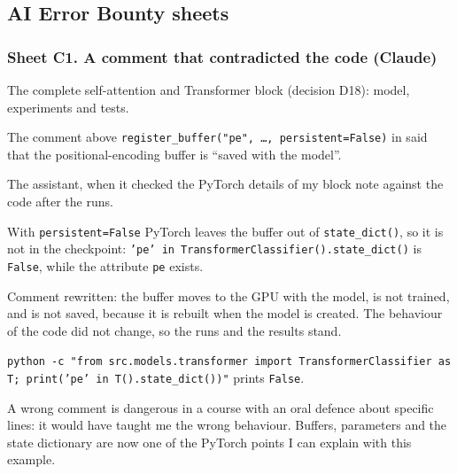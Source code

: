 \subsection*{AI Error Bounty sheets}

\subsubsection*{Sheet C1. A comment that contradicted the code (Claude)}
\begin{description}[style=nextline,leftmargin=1.2em]
  \item[Prompt] The complete self-attention and Transformer block (decision D18): model, experiments and
        tests.
  \item[Faulty response] The comment above \texttt{register\_buffer("pe", \ldots, persistent=False)} in
         said that the positional-encoding buffer is ``saved with the model''.
  \item[Detected by] The assistant, when it checked the PyTorch details of my block note against the code
        after the runs.
  \item[Proof] With \texttt{persistent=False} PyTorch leaves the buffer out of \texttt{state\_dict()}, so it
        is not in the checkpoint: \texttt{'pe' in TransformerClassifier().state\_dict()} is \texttt{False},
        while the attribute \texttt{pe} exists.
  \item[Correction] Comment rewritten: the buffer moves to the GPU with the model, is not trained, and is
        not saved, because it is rebuilt when the model is created. The behaviour of the code did not change,
        so the runs and the results stand.
  \item[Reproduction] \texttt{python -c "from src.models.transformer import TransformerClassifier as T;
        print('pe' in T().state\_dict())"} prints \texttt{False}.
  \item[Reflection] A wrong comment is dangerous in a course with an oral defence about specific lines: it
        would have taught me the wrong behaviour. Buffers, parameters and the state dictionary are now one of
        the PyTorch points I can explain with this example.
\end{description}

